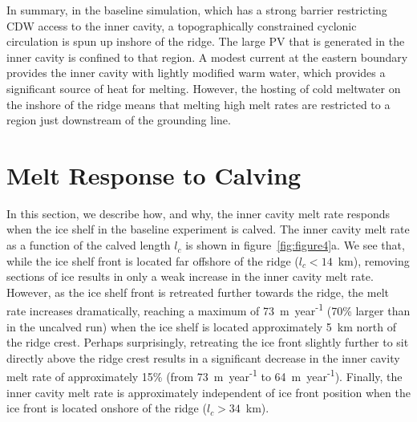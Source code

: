 \documentclass[draft]{agujournal2019}
\begin{document}
In summary, in the baseline simulation, which has a strong barrier restricting CDW access to the inner cavity, a topographically constrained cyclonic circulation is spun up inshore of the ridge. The large PV that is generated in the inner cavity is confined to that region. A modest current at the eastern boundary provides the inner cavity with lightly modified warm water, which provides a significant source of heat for melting. However, the hosting of cold meltwater on the inshore of the ridge means that melting high melt rates are restricted to a region just downstream of the grounding line.


\section{Melt Response to Calving}\label{S:Results:lc}
In this section, we describe how, and why, the inner cavity melt rate responds when the ice shelf in the baseline experiment is calved. The inner cavity melt rate as a function of the calved length $l_c$ is shown in figure~\ref{fig:figure4}a. We see that, while the ice shelf front is located far offshore of the ridge ($l_c< 14$~km), removing sections of ice results in only a weak increase in the inner cavity melt rate. However, as the ice shelf front is retreated further towards the ridge, the melt rate increases dramatically, reaching a maximum of 73~m~year\textsuperscript{-1} (70\% larger than in the uncalved run) when the ice shelf is located approximately 5~km north of the ridge crest. Perhaps surprisingly, retreating the ice front slightly further to sit directly above the ridge crest results in a significant decrease in the inner cavity melt rate of approximately 15\% (from 73~m~year\textsuperscript{-1} to 64~m~year\textsuperscript{-1}). Finally, the inner cavity melt rate is approximately independent of ice front position when the ice front is located onshore of the ridge ($l_c>34$~km).
\end{document}
